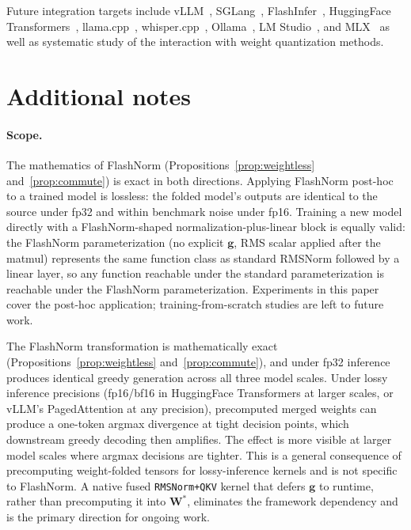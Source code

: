 \documentclass{article}
\begin{document}
Future integration targets include
vLLM~\citep{vLLM}, SGLang~\citep{sglang}, FlashInfer~\citep{flashInfer},
HuggingFace Transformers~\citep{HFtransformers},
llama.cpp~\citep{llama-cpp}, whisper.cpp~\citep{whisper-cpp},
Ollama~\citep{ollama}, LM Studio~\citep{lmstudio}, and MLX~\citep{mlx} as well as systematic
study of the interaction with weight quantization methods.





\appendix

\section{Additional notes}\label{app:additional-notes}

\paragraph{Scope.} The mathematics of FlashNorm (Propositions~\ref{prop:weightless} and~\ref{prop:commute}) is exact in both directions. Applying FlashNorm post-hoc to a trained model is lossless: the folded model's outputs are identical to the source under fp32 and within benchmark noise under fp16. Training a new model directly with a FlashNorm-shaped normalization-plus-linear block is equally valid: the FlashNorm parameterization (no explicit $\mathbf{g}$, RMS scalar applied after the matmul) represents the same function class as standard RMSNorm followed by a linear layer, so any function reachable under the standard parameterization is reachable under the FlashNorm parameterization. Experiments in this paper cover the post-hoc application; training-from-scratch studies are left to future work.

The FlashNorm transformation is mathematically exact (Propositions~\ref{prop:weightless} and~\ref{prop:commute}), and under fp32 inference produces identical greedy generation across all three model scales. Under lossy inference precisions (fp16/bf16 in HuggingFace Transformers at larger scales, or vLLM's PagedAttention at any precision), precomputed merged weights can produce a one-token argmax divergence at tight decision points, which downstream greedy decoding then amplifies. The effect is more visible at larger model scales where argmax decisions are tighter. This is a general consequence of precomputing weight-folded tensors for lossy-inference kernels and is not specific to FlashNorm. A native fused \texttt{RMSNorm+QKV} kernel that defers $\mathbf{g}$ to runtime, rather than precomputing it into $\mathbf{W^\ast}$, eliminates the framework dependency and is the primary direction for ongoing work.
\end{document}
